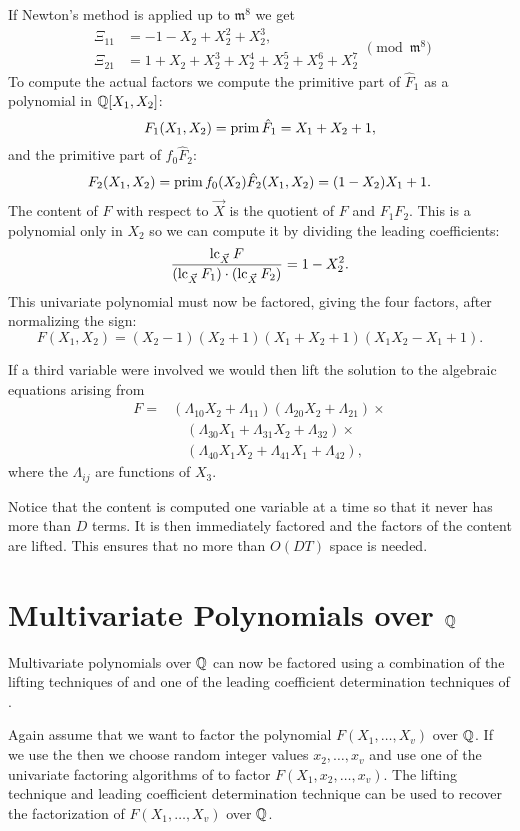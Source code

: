 If Newton's method is applied up to $\mathfrak{m}^8$ we get
\[
\begin{aligned}
\Xi_{11} &= -1 -X_2 + X_2^2 + X_2^3, \\
\Xi_{21} &= 1 + X_2 + X_2^3 + X_2^4 + X_2^5 + X_2^6 + X_2^7
\end{aligned}
\pmod{\mathfrak{m}^8}
\]
To compute the actual factors we compute the primitive
part of $\hat{F}_1$ as a
polynomial in $\mathbb{Q}[X_1, X_2]$:
\[
F_1(X_1, X_2) = \mathop{\rm prim}\nolimits \hat{F}_1 = X_1 + X_2 + 1,
\]
and the primitive part of $f_0 \hat{F}_2$:
\[
F_2(X_1, X_2) = \mathop{\rm prim}\nolimits f_0(X_2) \hat{F}_2(X_1, X_2) = (1 - X_2) X_1 +
1.
\]
The content of $F$ with respect to $\vec{X}$ is the quotient of $F$
and $F_1 F_2$.  This is a polynomial only in $X_2$ so we can compute
it by dividing the leading coefficients:
\[
\frac{\mathop{\rm lc}\nolimits_{\vec{X}} F}{(\mathop{\rm lc}\nolimits_{\vec{X}} F_1) \cdot (\mathop{\rm lc}\nolimits_{\vec{X}} F_2)}
= 1 - X_2^2.
\]
This univariate polynomial must now be factored, giving the four
factors, after normalizing the sign:
\[
F(X_1, X_2) =
(X_2 -1) (X_2 + 1) (X_1 + X_2 + 1) (X_1 X_2 - X_1 + 1).
\]

If a third variable were involved we would then lift the solution to
the algebraic equations arising from
\[
\begin{aligned}
F = 
&(\Lambda_{10}X_2 + \Lambda_{11})
(\Lambda_{20}X_2 + \Lambda_{21}) \times \\
&\quad (\Lambda_{30} X_1 + \Lambda_{31}X_2 + \Lambda_{32}) \times \\
&\quad (\Lambda_{40}X_1 X_2 + \Lambda_{41} X_1 + \Lambda_{42}),
\end{aligned}
\]
where the $\Lambda_{ij}$ are functions of $X_3$.

Notice that the content is computed one variable at a time so that it
never has more than $D$ terms.  It is then immediately factored and
the factors of the content are lifted.  This ensures that no more
than $O(DT)$ space is needed.

\section{Multivariate Polynomials over $\mathbb{Q}$}
\label{GF:Integers:Sec}

Multivariate polynomials over $\mathbb{Q}$ can now be factored using a
combination of the lifting techniques of  and one
of the leading coefficient determination techniques of
.

Again assume that we want to factor the polynomial $F(X_1, \ldots, X_v)$
over $\mathbb{Q}$. If we use the  then we
choose random integer values $x_2, \ldots, x_v$ and use one of the
univariate factoring algorithms of  to factor
$F(X_1, x_2, \ldots, x_v)$.  The lifting technique and leading
coefficient determination technique can be used to recover the
factorization of $F(X_1, \ldots, X_v)$ over $\mathbb{Q}$.

